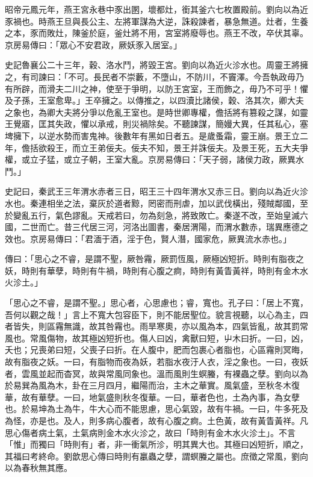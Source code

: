 \begin{pinyinscope}
昭帝元鳳元年，燕王宮永巷中豕出圂，壞都灶，銜其釜六七枚置殿前。劉向以為近豕禍也。時燕王旦與長公主、左將軍謀為大逆，誅殺諫者，暴急無道。灶者，生養之本，豕而敗灶，陳釜於庭，釜灶將不用，宮室將廢辱也。燕王不改，卒伏其辜。京房易傳曰：「眾心不安君政，厥妖豕入居室。」

史記魯襄公二十三年，穀、洛水鬥，將毀王宮。劉向以為近火沴水也。周靈王將擁之，有司諫曰：「不可。長民者不崇藪，不墮山，不防川，不竇澤。今吾執政毋乃有所辟，而滑夫二川之神，使至于爭明，以防王宮室，王而飾之，毋乃不可乎！懼及子孫，王室愈卑。」王卒擁之。以傳推之，以四瀆比諸侯，穀、洛其次，卿大夫之象也，為卿大夫將分爭以危亂王室也。是時世卿專權，儋括將有篡殺之謀，如靈王覺寤，匡其失政，懼以承戒，則災禍除矣。不聽諫謀，簡嫚大異，任其私心，塞埤擁下，以逆水勢而害鬼神。後數年有黑如日者五。是歲蚤霜，靈王崩。景王立二年，儋括欲殺王，而立王弟佞夫。佞夫不知，景王并誅佞夫。及景王死，五大夫爭權，或立子猛，或立子朝，王室大亂。京房易傳曰：「天子弱，諸侯力政，厥異水鬥。」

史記曰，秦武王三年渭水赤者三日，昭王三十四年渭水又赤三日。劉向以為近火沴水也。秦連相坐之法，棄灰於道者黥，罔密而刑虐，加以武伐橫出，殘賊鄰國，至於變亂五行，氣色謬亂。天戒若曰，勿為刻急，將致敗亡。秦遂不改，至始皇滅六國，二世而亡。昔三代居三河，河洛出圖書，秦居渭陽，而渭水數赤，瑞異應德之效也。京房易傳曰：「君湎于酒，淫于色，賢人潛，國家危，厥異流水赤也。」

傳曰：「思心之不睿，是謂不聖，厥咎霿，厥罰恆風，厥極凶短折。時則有脂夜之妖，時則有華孽，時則有牛禍，時則有心腹之痾，時則有黃眚黃祥，時則有金木水火沴土。」

「思心之不睿，是謂不聖。」思心者，心思慮也；睿，寬也。孔子曰：「居上不寬，吾何以觀之哉！」言上不寬大包容臣下，則不能居聖位。貌言視聽，以心為主，四者皆失，則區霿無識，故其咎霿也。雨旱寒奧，亦以風為本，四氣皆亂，故其罰常風也。常風傷物，故其極凶短折也。傷人曰凶，禽獸曰短，屮木曰折。一曰，凶，夭也；兄喪弟曰短，父喪子曰折。在人腹中，肥而包裹心者脂也，心區霿則冥晦，故有脂夜之妖。一曰，有脂物而夜為妖，若脂水夜汙人衣，淫之象也。一曰，夜妖者，雲風並起而杳冥，故與常風同象也。溫而風則生螟螣，有裸蟲之孽。劉向以為於易巽為風為木，卦在三月四月，繼陽而治，主木之華實。風氣盛，至秋冬木復華，故有華孽。一曰，地氣盛則秋冬復華。一曰，華者色也，土為內事，為女孽也。於易坤為土為牛，牛大心而不能思慮，思心氣毀，故有牛禍。一曰，牛多死及為怪，亦是也。及人，則多病心腹者，故有心腹之痾。土色黃，故有黃眚黃祥。凡思心傷者病土氣，土氣病則金木水火沴之，故曰「時則有金木水火沴土」。不言「惟」而獨曰「時則有」者，非一衝氣所沴，明其異大也。其極曰凶短折，順之，其福曰考終命。劉歆思心傳曰時則有臝蟲之孽，謂螟螣之屬也。庶徵之常風，劉向以為春秋無其應。


\end{pinyinscope}
